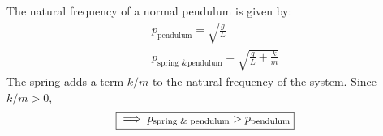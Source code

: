 \subsection{}
The natural frequency of a normal pendulum is given by:
\begin{align*}
    &p_{\text{pendulum}} = \sqrt{\frac{g}{L}} \\
    &p_{\text{spring \& pendulum}} = \sqrt{\frac{g}{L} + \frac{k}{m}} 
\end{align*}
The spring adds a term $k/m$ to the natural frequency of the system. Since $k/m > 0$,
\begin{align*}
    \Aboxed{\implies p_{\text{spring \& pendulum}} > p_{\text{pendulum}}}
\end{align*}